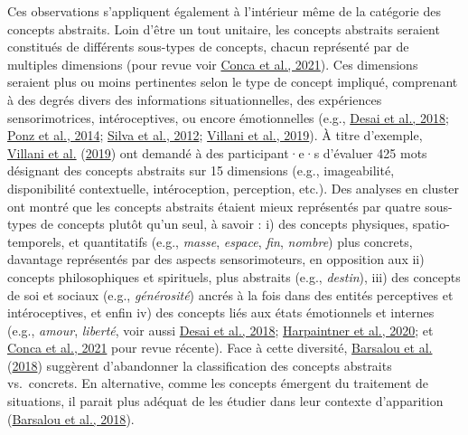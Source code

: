 \documentclass[
  a4paper,12pt,twoside,onecolumn,openright,final,oldfontcommands]{memoir}
\begin{document}
Ces observations s'appliquent également à l'intérieur même de la catégorie des concepts abstraits. Loin d'être un tout unitaire, les concepts abstraits seraient constitués de différents sous-types de concepts, chacun représenté par de multiples dimensions (pour revue voir \protect\hyperlink{ref-conca_multidimensionality_2021}{Conca et al., 2021}). Ces dimensions seraient plus ou moins pertinentes selon le type de concept impliqué, comprenant à des degrés divers des informations situationnelles, des expériences sensorimotrices, intéroceptives, ou encore émotionnelles (e.g., \protect\hyperlink{ref-desai_multifaceted_2018}{Desai et al., 2018}; \protect\hyperlink{ref-ponz_emotion_2014}{Ponz et al., 2014}; \protect\hyperlink{ref-silva_emotions_2012}{Silva et al., 2012}; \protect\hyperlink{ref-villani_varieties_2019}{Villani et al., 2019}). À titre d'exemple, \protect\hyperlink{ref-villani_varieties_2019}{Villani et al.} (\protect\hyperlink{ref-villani_varieties_2019}{2019}) ont demandé à des participant·e·s d'évaluer 425 mots désignant des concepts abstraits sur 15 dimensions (e.g., imageabilité, disponibilité contextuelle, intéroception, perception, etc.). Des analyses en cluster ont montré que les concepts abstraits étaient mieux représentés par quatre sous-types de concepts plutôt qu'un seul, à savoir : i) des concepts physiques, spatio-temporels, et quantitatifs (e.g., \emph{masse}, \emph{espace}, \emph{fin}, \emph{nombre}) plus concrets, davantage représentés par des aspects sensorimoteurs, en opposition aux ii) concepts philosophiques et spirituels, plus abstraits (e.g., \emph{destin}), iii) des concepts de soi et sociaux (e.g., \emph{générosité}) ancrés à la fois dans des entités perceptives et intéroceptives, et enfin iv) des concepts liés aux états émotionnels et internes (e.g., \emph{amour}, \emph{liberté}, voir aussi \protect\hyperlink{ref-desai_multifaceted_2018}{Desai et al., 2018}; \protect\hyperlink{ref-harpaintner_grounding_2020}{Harpaintner et al., 2020}; et \protect\hyperlink{ref-conca_multidimensionality_2021}{Conca et al., 2021} pour revue récente). Face à cette diversité, \protect\hyperlink{ref-barsalou_moving_2018}{Barsalou et al.} (\protect\hyperlink{ref-barsalou_moving_2018}{2018}) suggèrent d'abandonner la classification des concepts abstraits vs.~concrets. En alternative, comme les concepts émergent du traitement de situations, il parait plus adéquat de les étudier dans leur contexte d'apparition (\protect\hyperlink{ref-barsalou_moving_2018}{Barsalou et al., 2018}).
\end{document}
